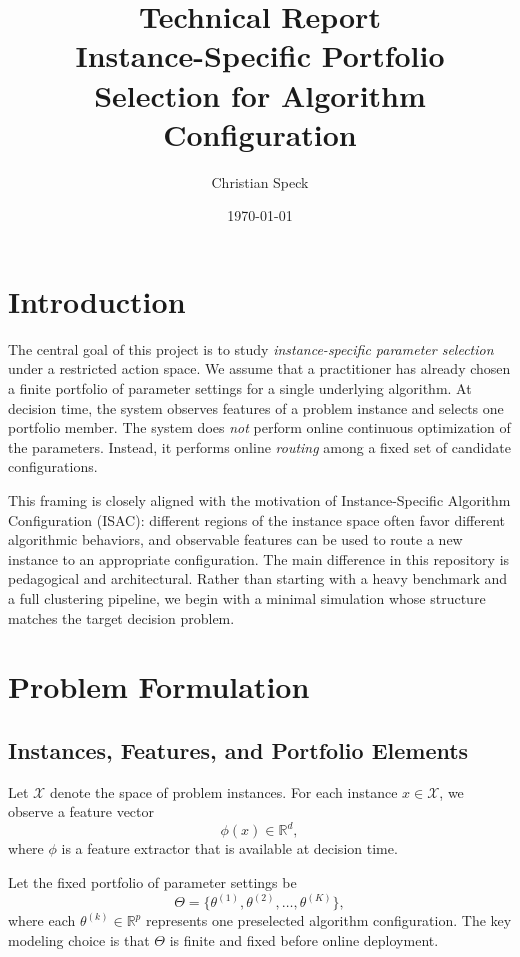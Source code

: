 \documentclass[11pt]{report}
\title{Technical Report\\[0.4em]\large Instance-Specific Portfolio Selection for Algorithm Configuration}
\author{Christian Speck}
\date{\today}
\begin{document}
\hypersetup{pageanchor=false}
\maketitle
{}
\tableofcontents
\clearpage
\hypersetup{pageanchor=true}

\chapter{Introduction}

The central goal of this project is to study \emph{instance-specific parameter selection} under a restricted action space. We assume that a practitioner has already chosen a finite portfolio of parameter settings for a single underlying algorithm. At decision time, the system observes features of a problem instance and selects one portfolio member. The system does \emph{not} perform online continuous optimization of the parameters. Instead, it performs online \emph{routing} among a fixed set of candidate configurations.

This framing is closely aligned with the motivation of Instance-Specific Algorithm Configuration (ISAC): different regions of the instance space often favor different algorithmic behaviors, and observable features can be used to route a new instance to an appropriate configuration. The main difference in this repository is pedagogical and architectural. Rather than starting with a heavy benchmark and a full clustering pipeline, we begin with a minimal simulation whose structure matches the target decision problem.

\chapter{Problem Formulation}

\section{Instances, Features, and Portfolio Elements}

Let $\mathcal{X}$ denote the space of problem instances. For each instance $x \in \mathcal{X}$, we observe a feature vector
\[
\phi(x) \in \mathbb{R}^d,
\]
where $\phi$ is a feature extractor that is available at decision time.

Let the fixed portfolio of parameter settings be
\[
\Theta = \{\theta^{(1)}, \theta^{(2)}, \dots, \theta^{(K)}\},
\]
where each $\theta^{(k)} \in \mathbb{R}^p$ represents one preselected algorithm configuration. The key modeling choice is that $\Theta$ is finite and fixed before online deployment.
\end{document}
